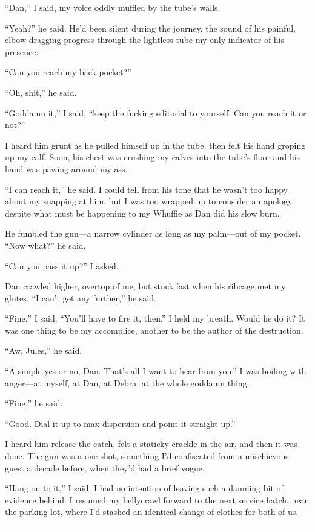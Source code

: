 “Dan,” I said, my voice oddly muffled by the tube's walls.

“Yeah?” he said. He'd been silent during the journey, the sound of
his painful, elbow-dragging progress through the lightless tube my
only indicator of his presence.

“Can you reach my back pocket?”

“Oh, shit,” he said.

“Goddamn it,” I said, “keep the fucking editorial to yourself. Can
you reach it or not?”

I heard him grunt as he pulled himself up in the tube, then felt
his hand groping up my calf. Soon, his chest was crushing my calves
into the tube's floor and his hand was pawing around my ass.

“I can reach it,” he said. I could tell from his tone that he
wasn't too happy about my snapping at him, but I was too wrapped up
to consider an apology, despite what must be happening to my
Whuffie as Dan did his slow burn.

He fumbled the gun—a narrow cylinder as long as my palm—out of my
pocket. “Now what?” he said.

“Can you pass it up?” I asked.

Dan crawled higher, overtop of me, but stuck fast when his ribcage
met my glutes. “I can't get any further,” he said.

“Fine,” I said. “You'll have to fire it, then.” I held my breath.
Would he do it? It was one thing to be my accomplice, another to be
the author of the destruction.

“Aw, Jules,” he said.

“A simple yes or no, Dan. That's all I want to hear from you.” I
was boiling with anger—at myself, at Dan, at Debra, at the whole
goddamn thing.

“Fine,” he said.

“Good. Dial it up to max dispersion and point it straight up.”

I heard him release the catch, felt a staticky crackle in the air,
and then it was done. The gun was a one-shot, something I'd
confiscated from a mischievous guest a decade before, when they'd
had a brief vogue.

“Hang on to it,” I said. I had no intention of leaving such a
damning bit of evidence behind. I resumed my bellycrawl forward to
the next service hatch, near the parking lot, where I'd stashed an
identical change of clothes for both of us.

\begin{center}\rule{3in}{0.4pt}\end{center}

